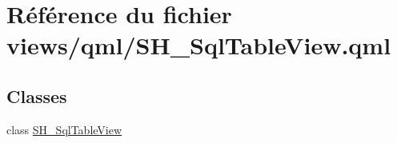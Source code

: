 \hypertarget{SH__SqlTableView_8qml}{\section{Référence du fichier views/qml/\-S\-H\-\_\-\-Sql\-Table\-View.qml}
\label{SH__SqlTableView_8qml}
}
\subsection*{Classes}
\begin{DoxyCompactItemize}
\item 
class \hyperlink{classSH__SqlTableView}{S\-H\-\_\-\-Sql\-Table\-View}
\end{DoxyCompactItemize}
